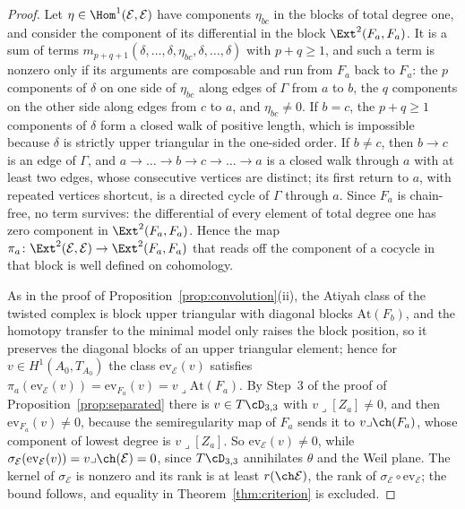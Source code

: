 \begin{proof}
Let $\eta\in\Hom^{1}(\mathcal{E},\mathcal{E})$ have components $\eta_{bc}$ in the blocks of total degree one, and consider the component of its differential in the block $\Ext^{2}(F_{a},F_{a})$. It is a sum of terms $m_{p+q+1}(\delta,\dots,\delta,\eta_{bc},\delta,\dots,\delta)$ with $p+q\ge1$, and such a term is nonzero only if its arguments are composable and run from $F_{a}$ back to $F_{a}$: the $p$ components of $\delta$ on one side of $\eta_{bc}$ along edges of $\Gamma$ from $a$ to $b$, the $q$ components on the other side along edges from $c$ to $a$, and $\eta_{bc}\ne0$. If $b=c$, the $p+q\ge1$ components of $\delta$ form a closed walk of positive length, which is impossible because $\delta$ is strictly upper triangular in the one-sided order. If $b\ne c$, then $b\to c$ is an edge of $\Gamma$, and $a\to\dots\to b\to c\to\dots\to a$ is a closed walk through $a$ with at least two edges, whose consecutive vertices are distinct; its first return to $a$, with repeated vertices shortcut, is a directed cycle of $\Gamma$ through $a$. Since $F_{a}$ is chain-free, no term survives: the differential of every element of total degree one has zero component in $\Ext^{2}(F_{a},F_{a})$. Hence the map $\pi_{a}\colon\Ext^{2}(\mathcal{E},\mathcal{E})\to\Ext^{2}(F_{a},F_{a})$ that reads off the component of a cocycle in that block is well defined on cohomology.

As in the proof of Proposition~\ref{prop:convolution}(ii), the Atiyah class of the twisted complex is block upper triangular with diagonal blocks $\mathrm{At}(F_{b})$, and the homotopy transfer to the minimal model only raises the block position, so it preserves the diagonal blocks of an upper triangular element; hence for $v\in H^{1}(A_{0},T_{A_{0}})$ the class $\mathrm{ev}_{\mathcal{E}}(v)$ satisfies $\pi_{a}(\mathrm{ev}_{\mathcal{E}}(v))=\mathrm{ev}_{F_{a}}(v)=v\lrcorner\mathrm{At}(F_{a})$. By Step~3 of the proof of Proposition~\ref{prop:separated} there is $v\in T\cD_{3,3}$ with $v\lrcorner[Z_{a}]\ne0$, and then $\mathrm{ev}_{F_{a}}(v)\ne0$, because the semiregularity map of $F_{a}$ sends it to $v\lrcorner\ch(F_{a})$, whose component of lowest degree is $v\lrcorner[Z_{a}]$. So $\mathrm{ev}_{\mathcal{E}}(v)\ne0$, while $\sigma_{\mathcal{E}}(\mathrm{ev}_{\mathcal{E}}(v))=v\lrcorner\ch(\mathcal{E})=0$, since $T\cD_{3,3}$ annihilates $\theta$ and the Weil plane. The kernel of $\sigma_{\mathcal{E}}$ is nonzero and its rank is at least $r(\ch\mathcal{E})$, the rank of $\sigma_{\mathcal{E}}\circ\mathrm{ev}_{\mathcal{E}}$; the bound follows, and equality in Theorem~\ref{thm:criterion} is excluded.
\end{proof}


